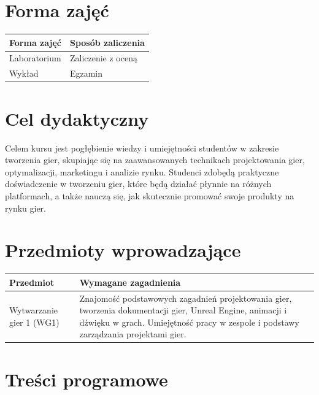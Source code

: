 \documentclass[12pt, a4paper]{article}
\begin{document}
\section{Forma zajęć}

\begin{tabular}{ll}
  \hline
  \textbf{Forma zajęć} & \textbf{Sposób zaliczenia} \\
  \hline
  Laboratorium & Zaliczenie z oceną \\
  Wykład & Egzamin \\
  \hline
\end{tabular}

\section{Cel dydaktyczny}

Celem kursu jest pogłębienie wiedzy i umiejętności studentów w zakresie tworzenia gier, skupiając się na zaawansowanych technikach projektowania gier, optymalizacji, marketingu i analizie rynku. Studenci zdobędą praktyczne doświadczenie w tworzeniu gier, które będą działać płynnie na różnych platformach, a także nauczą się, jak skutecznie promować swoje produkty na rynku gier.

\section{Przedmioty wprowadzające}

\begin{tabularx}{\textwidth}{lX}
  \hline
  \textbf{Przedmiot} & \textbf{Wymagane zagadnienia} \\
  \hline
  Wytwarzanie gier 1 (WG1) & Znajomość podstawowych zagadnień projektowania gier, tworzenia dokumentacji gier, Unreal Engine, animacji i dźwięku w grach. Umiejętność pracy w zespole i podstawy zarządzania projektami gier. \\
  \hline
\end{tabularx}

\section{Treści programowe}
\end{document}

